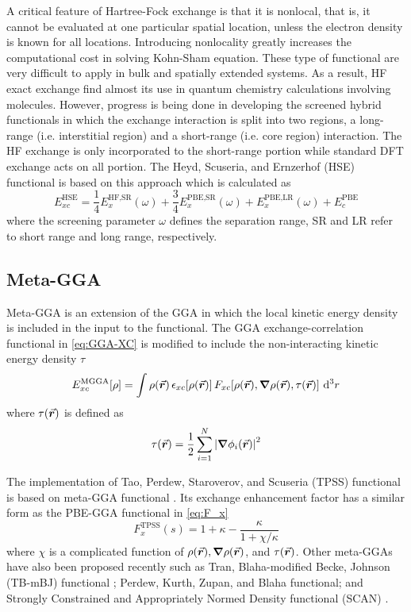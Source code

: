 A critical feature of Hartree-Fock exchange is that it is nonlocal, that is, it cannot be evaluated at one particular spatial location, unless the electron density is known for all locations. Introducing nonlocality greatly increases the computational cost in solving Kohn-Sham equation. These type of functional are very difficult to apply in bulk and spatially extended systems. As a result, HF exact exchange find almost its use in quantum chemistry calculations involving molecules.
However, progress is being done in developing the screened hybrid functionals in which the exchange interaction is split into two regions, a long-range (i.e. interstitial region) and a short-range (i.e. core region)  interaction. The HF exchange is only incorporated to the short-range portion while standard DFT exchange acts on all portion. The Heyd, Scuseria, and Ernzerhof (HSE) functional is based on this approach which is calculated as \citep{Heyd2003,Krukau2006}
\begin{equation}
	E_{xc}^{\text{HSE}} = \frac{1}{4} E_x^{\text{HF,SR}}(\omega) +  \frac{3}{4} E_x^{\text{PBE,SR}}(\omega) + E_x^{\text{PBE,LR}}(\omega) + E_c^{\text{PBE}}
\end{equation}
where the screening parameter $\omega$ defines the separation
range, SR and LR refer to short range and long range, respectively.


\subsection{Meta-GGA}
Meta-GGA is an extension of the GGA in which the local kinetic energy density is included in the input to the functional. The GGA exchange-correlation functional in \eqref{eq:GGA-XC} is modified to include the non-interacting kinetic energy density $\tau$ \citep{Staroverov2004}
\begin{equation}
	E^{\text{MGGA}}_{xc} [\rho]= \int \rho({\va*{r}})\, \epsilon_{xc}[\rho({\va*{r}})]\, F_{xc}[\rho({\va*{r}}),\grad \rho({\va*{r}}),\tau(\va*{r})] \,  \dd[3]{r}
\end{equation}
where $\tau(\va*{r})$ is  defined as
\begin{equation}
	\tau(\va*{r}) = \frac{1}{2} \sum_{i=1}^N \abs{\grad \phi_i(\va*{r})}^2
\end{equation}

The implementation of Tao, Perdew, Staroverov, and Scuseria (TPSS) functional is based on meta-GGA functional \citep{Tao2003}. Its exchange enhancement factor  has a similar form as the PBE-GGA functional in \eqref{eq:F_x} \citep{Staroverov2004}
\begin{equation}
	F_{x}^{\text{TPSS}}(s) = 1 + \kappa  - \frac{\kappa}{1+\chi/\kappa}
\end{equation}
where $\chi$ is a complicated function of $\rho({\va*{r}}),\grad \rho({\va*{r}})$, and $\tau(\va*{r})$. Other  meta-GGAs  have  also been  proposed  recently such as Tran, Blaha-modified Becke, Johnson (TB-mBJ) functional \citep{Tran2009};  Perdew, Kurth, Zupan, and Blaha functional\citep{Perdew1999}; and Strongly Constrained and Appropriately Normed Density functional (SCAN) \citep{Sun2015}.

